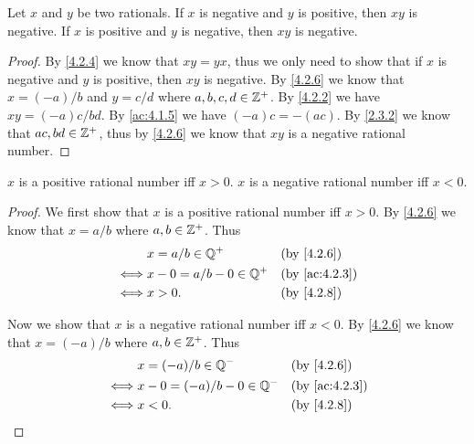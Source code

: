\begin{ac}\label{ac:4.2.6}
  Let \(x\) and \(y\) be two rationals.
  If \(x\) is negative and \(y\) is positive, then \(xy\) is negative.
  If \(x\) is positive and \(y\) is negative, then \(xy\) is negative.
\end{ac}

\begin{proof}
  By \cref{4.2.4} we know that \(xy = yx\), thus we only need to show that if \(x\) is negative and \(y\) is positive, then \(xy\) is negative.
  By \cref{4.2.6} we know that \(x = (-a) / b\) and \(y = c / d\) where \(a, b, c, d \in \mathbb{Z}^+\).
  By \cref{4.2.2} we have \(xy = (-a)c / bd\).
  By \cref{ac:4.1.5} we have \((-a)c = -(ac)\).
  By \cref{2.3.2} we know that \(ac, bd \in \mathbb{Z}^+\), thus by \cref{4.2.6} we know that \(xy\) is a negative rational number.
\end{proof}

\begin{ac}\label{ac:4.2.7}
  \(x\) is a positive rational number iff \(x > 0\).
  \(x\) is a negative rational number iff \(x < 0\).
\end{ac}

\begin{proof}
  We first show that \(x\) is a positive rational number iff \(x > 0\).
  By \cref{4.2.6} we know that \(x = a / b\) where \(a, b \in \mathbb{Z}^+\).
  Thus
  \begin{align*}
         & x = a / b \in \Q^+         &  & \by{4.2.6}    \\
    \iff & x - 0 = a / b - 0 \in \Q^+ &  & \by{ac:4.2.3} \\
    \iff & x > 0.                     &  & \by{4.2.8}
  \end{align*}

  Now we show that \(x\) is a negative rational number iff \(x < 0\).
  By \cref{4.2.6} we know that \(x = (-a) / b\) where \(a, b \in \mathbb{Z}^+\).
  Thus
  \begin{align*}
         & x = (-a) / b \in \Q^-         &  & \by{4.2.6}    \\
    \iff & x - 0 = (-a) / b - 0 \in \Q^- &  & \by{ac:4.2.3} \\
    \iff & x < 0.                        &  & \by{4.2.8}
  \end{align*}
\end{proof}

